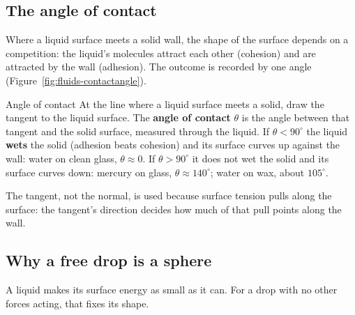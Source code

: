 \subsection{The angle of contact}

Where a liquid surface meets a solid wall, the shape of the surface depends on a competition: the liquid's
molecules attract each other (cohesion) and are attracted by the wall (adhesion). The outcome is recorded
by one angle (Figure~\ref{fig:fluids-contactangle}).

\begin{figure}[htbp]
\centering
{}
\end{figure}

\begin{defbox}{Angle of contact}
At the line where a liquid surface meets a solid, draw the tangent to the liquid surface. The \textbf{angle
of contact} $\theta$ is the angle between that tangent and the solid surface, measured through the liquid.
If $\theta<90^\circ$ the liquid \textbf{wets} the solid (adhesion beats cohesion) and its surface curves up
against the wall: water on clean glass, $\theta\approx0$. If $\theta>90^\circ$ it does not wet the solid
and its surface curves down: mercury on glass, $\theta\approx140^\circ$; water on wax, about $105^\circ$.
\end{defbox}

The tangent, not the normal, is used because surface tension pulls along the surface: the tangent's
direction decides how much of that pull points along the wall.

\subsection{Why a free drop is a sphere}

A liquid makes its surface energy as small as it can. For a drop with no other forces acting, that fixes
its shape.


